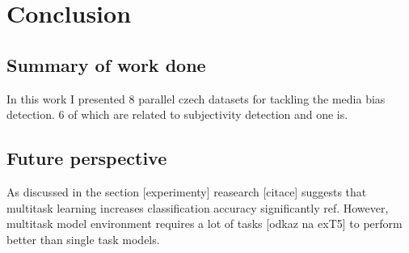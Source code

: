 \chapter{Conclusion}
\section{Summary of work done}
In this work I presented 8 parallel czech datasets for tackling the media bias detection. 6 of which are related to subjectivity detection and one is.
\section{Future perspective}
As discussed in the section [experimenty] reasearch [citace] suggests that multitask learning increases classification accuracy significantly ref. However, multitask model environment requires a lot of tasks [odkaz na exT5] to perform better than single task models.  